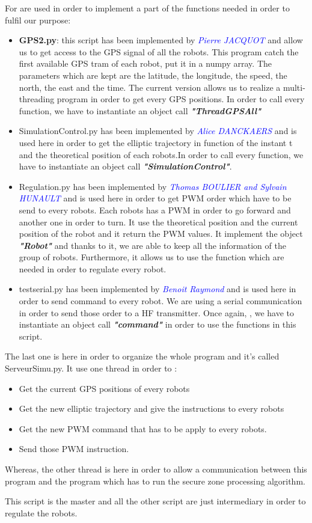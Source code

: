 For are used in order to implement a part of the functions needed in order to fulfil our purpose:
\begin{itemize}

\item \textbf{GPS2.py}: this script has been implemented by \textcolor{blue}{\textit{Pierre JACQUOT}} and allow us to get access to the GPS signal of all the robots. This program catch the first available GPS tram of each robot, put it in a numpy array. The parameters which are kept are the latitude, the longitude, the speed, the north, the east and the time. The current version allows us to realize a multi-threading program in order to get every GPS positions. In order to call every function, we have to instantiate an object call \textbf{\textit{"ThreadGPSAll"}}
\item SimulationControl.py has been implemented by  \textcolor{blue}{\textit{Alice DANCKAERS}} and is used here in order to get the elliptic trajectory in function of the instant t and the theoretical position of each robots.In order to call every function, we have to instantiate an object call \textbf{\textit{"SimulationControl"}}.
\item Regulation.py has been implemented by  \textcolor{blue}{\textit{Thomas BOULIER and Sylvain HUNAULT}} and is used here in order to get PWM order which have to be send to every robots. Each robots has a PWM in order to go forward and another one in order to turn. It use the theoretical position and the current position of the robot and it return the PWM values. It implement the object \textbf{\textit{"Robot"}} and thanks to it, we are able to keep all the information of the group of robots. Furthermore, it allows us to use the function which are needed in order to regulate every robot. 
\item testserial.py has been implemented by  \textcolor{blue}{\textit{Benoit Raymond }} and is used here in order to send command to every robot. We are using a serial communication in order to send those order to a HF transmitter. Once again, , we have to instantiate an object call \textbf{\textit{"command"}} in order to use the functions in this script.

\end{itemize}

The last one is here in order to organize the whole program and it's called ServeurSimu.py.
It use one thread in order to :
\begin{itemize}
\item Get the current GPS positions of every robots
\item Get the new elliptic trajectory and give the instructions to every robots
\item Get the new PWM command that has to be apply to every robots.
\item Send those PWM instruction. 
\end{itemize}

Whereas, the other thread is here in order to allow a communication between this program and the program which has to run the secure zone processing algorithm.

This script is the master and all the other script are just intermediary in order to regulate the robots. 

\pagebreak